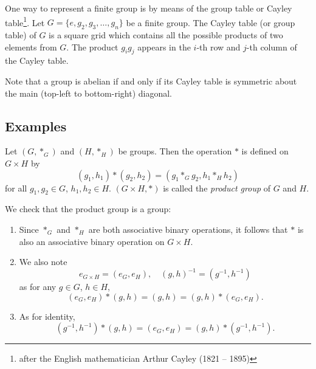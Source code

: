 One way to represent a finite group is by means of the group table or Cayley table\footnote{after
the English mathematician Arthur Cayley (1821 -- 1895)}. Let $G=\{e,g_2,g_3,\dots,g_n\}$ be a finite group. The Cayley table (or group table) of $G$ is a square grid which contains all the possible products of two elements from $G$. The product $g_ig_j$ appears in the $i$-th row and $j$-th column of the Cayley table.

\begin{remark}
Note that a group is abelian if and only if its Cayley table is symmetric about the main (top-left to bottom-right) diagonal.
\end{remark}

\subsection{Examples}
\begin{example}
Let $(G,\ast_G)$ and $(H,\ast_H)$ be groups. Then the operation $\ast$ is defined on $G\times H$ by
\[(g_1,h_1)\ast(g_2,h_2)=(g_1\ast_G g_2,h_1\ast_H h_2)\]
for all $g_1,g_2\in G$, $h_1,h_2\in H$. $(G\times H, \ast)$ is called the \emph{product group} of $G$ and $H$.

We check that the product group is a group:
\begin{enumerate}[label=(\roman*)]
\item Since $\ast_G$ and $\ast_H$ are both associative binary operations, it follows that $\ast$ is also an associative binary operation on $G \times H$.
\item We also note
\[e_{G\times H}=(e_G,e_H),\quad(g,h)^{-1}=(g^{-1},h^{-1})\]
as for any $g \in G$, $h \in H$,
\[(e_G,e_H)\ast(g,h)=(g,h)=(g,h)\ast(e_G,e_H).\]
\item As for identity,
\[(g^{-1},h^{-1})\ast(g,h)=(e_G,e_H)=(g,h)\ast(g^{-1},h^{-1}).\]
\end{enumerate}
\end{example}

